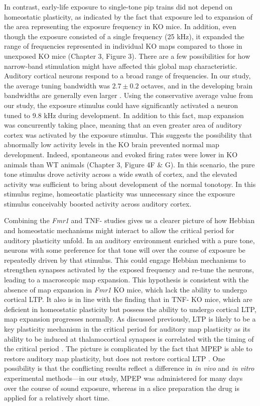 In contrast, early-life exposure to single-tone pip trains did not depend on homeostatic plasticity, as indicated by the fact that exposure led to expansion of the area representing the exposure frequency in KO mice. In addition, even though the exposure consisted of a single frequency (25 kHz), it expanded the range of frequencies represented in individual KO maps compared to those in unexposed KO mice (Chapter 3, Figure 3). There are a few possibilities for how narrow-band stimulation might have affected this global map characteristic. Auditory cortical neurons respond to a broad range of frequencies. In our study, the average tuning bandwidth was $2.7\pm0.2$ octaves, and in the developing brain bandwidths are generally even larger \cite{Zhang2001}. Using the conservative average value from our study, the exposure stimulus could have significantly activated a neuron tuned to 9.8 kHz during development. In addition to this fact, map expansion was concurrently taking place, meaning that an even greater area of auditory cortex was activated by the exposure stimulus. This suggests the possibility that abnormally low activity levels in the KO brain prevented normal map development. Indeed, spontaneous and evoked firing rates were lower in KO animals than WT animals (Chapter 3, Figure 4F \& G). In this scenario, the pure tone stimulus drove activity across a wide swath of cortex, and the elevated activity was sufficient to bring about development of the normal tonotopy. In this stimulus regime, homeostatic plasticity was unnecessary since the exposure stimulus conceivably boosted activity across auditory cortex.

Combining the \textit{Fmr1} and TNF-\textalpha{} studies gives us a clearer picture of how Hebbian and homeostatic mechanisms might interact to allow the critical period for auditory plasticity unfold. In an auditory environment enriched with a pure tone, neurons with some preference for that tone will over the course of exposure be repeatedly driven by that stimulus. This could engage Hebbian mechanisms to strengthen synapses activated by the exposed frequency and re-tune the neurons, leading to a macroscopic map expansion. This hypothesis is consistent with the absence of map expansion in \textit{Fmr1} KO mice, which lack the ability to undergo cortical LTP. It also is in line with the finding that in TNF-\textalpha{} KO mice, which are deficient in homeostatic plasticity but possess the ability to undergo cortical LTP, map expansion progresses normally. As discussed previously, LTP is likely to be a key plasticity mechanism in the critical period for auditory map plasticity as its ability to be induced at thalamocortical synapses is correlated with the timing of the critical period \cite{Chun2013}. The picture is complicated by the fact that MPEP is able to restore auditory map plasticity, but does not restore cortical LTP \cite{Wilson2007}. One possibility is that the conflicting results reflect a difference in \textit{in vivo} and \textit{in vitro} experimental methods---in our study, MPEP was administered for many days over the course of sound exposure, whereas in a slice preparation the drug is applied for a relatively short time.

